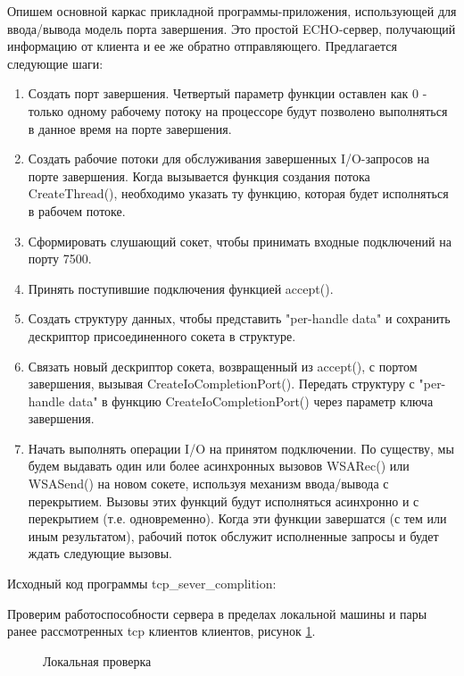 \documentclass[a4paper]{article}
\begin{document}
Опишем основной каркас прикладной программы-приложения, использующей для ввода/вывода модель порта завершения.  Это простой ECHO-сервер, получающий информацию от клиента и ее же обратно отправляющего. Предлагается следующие шаги:
\begin{enumerate}
\item Создать порт завершения. Четвертый параметр функции оставлен как 0 - только одному рабочему потоку на процессоре будут позволено выполняться в данное время на порте завершения.  
\item Создать рабочие потоки для обслуживания завершенных I/O-запросов на порте завершения. Когда вызывается функция создания потока CreateThread(), необходимо  указать ту функцию, которая будет исполняться в рабочем потоке. 
\item Сформировать слушающий сокет, чтобы принимать входные подключений на порту 7500.
\item Принять поступившие подключения функцией accept(). 
\item Создать структуру данных, чтобы представить "per-handle data" и сохранить дескриптор присоединенного сокета в структуре. 
\item Связать новый дескриптор сокета, возвращенный из accept(), с портом завершения,  вызывая CreateIoCompletionPort(). Передать структуру с "per-handle data" в функцию CreateIoCompletionPort() через параметр ключа завершения. 
\item Начать выполнять операции I/O на принятом подключении. По существу, мы будем выдавать один или более асинхронных вызовов WSARec() или WSASend() на новом сокете, используя  механизм ввода/вывода с перекрытием. Вызовы этих функций будут исполняться асинхронно и с перекрытием (т.е. одновременно). Когда эти функции завершатся (с тем или иным результатом), рабочий поток обслужит исполненные запросы и будет ждать следующие вызовы.	
\end{enumerate}

Исходный код программы tcp\_sever\_complition:
	
	
	Проверим работоспособности сервера в пределах локальной машины и пары ранее рассмотренных tcp клиентов клиентов, рисунок \ref{img:tcp_c_local_test}.
	\begin{figure}[h!]
		\caption{Локальная проверка}
		\label{img:tcp_c_local_test}
	\end{figure}
	
\end{document}
